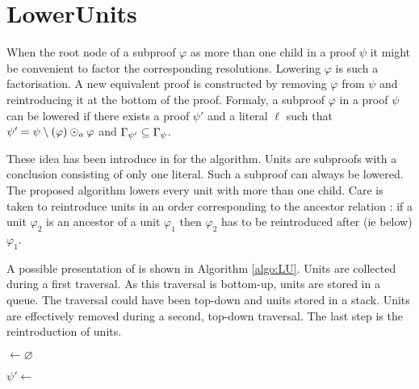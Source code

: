 \documentclass{llncs}
\begin{document}
\section{LowerUnits} \label{sec:LU}

When the root node of a subproof $\varphi$ as more than one child in a proof $\psi$ it might be
convenient to factor the corresponding resolutions. Lowering $\varphi$ is such a factorisation. A
new equivalent proof is constructed by removing $\varphi$ from $\psi$ and reintroducing it at the
bottom of the proof. Formaly, a subproof $\varphi$ in a proof $\psi$ can be lowered if there exists
a proof $\psi'$ and a literal $\ell$ such that $\psi' = \psi \setminus (\varphi) \odot_a \varphi$ and
$\Gamma_{\psi'} \subseteq \Gamma_{\psi}$.

These idea has been introduce in \cite{LURPI} for the {\LowerUnits} algorithm. Units are subproofs
with a conclusion consisting of only one literal. Such a subproof can always be lowered. The
proposed algorithm lowers every unit with more than one child. Care is taken to reintroduce units in
an order corresponding to the ancestor relation : if a unit $\varphi_2$ is an ancestor of a unit
$\varphi_1$ then $\varphi_2$ has to be reintroduced after (ie below) $\varphi_1$.

A possible presentation of {\LowerUnits} is shown in Algorithm \ref{algo:LU}. Units are collected
during a first traversal. As this traversal is bottom-up, units are stored in a queue. The traversal
could have been top-down and units stored in a stack. Units are effectively removed during a second,
top-down traversal. The last step is the reintroduction of units.

\begin{algorithm}[bt]
  \BlankLine

  \Units $\leftarrow \varnothing$ \;
  \BlankLine

  \BlankLine

  $\psi' \leftarrow $ \Rec{$\psi$,$\Units$} \;
  \BlankLine


  \caption{\LowerUnits}
  \label{algo:LU}
\end{algorithm}
\end{document}
